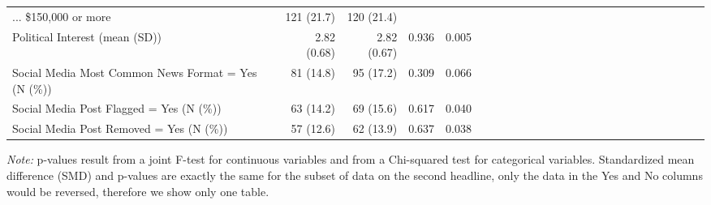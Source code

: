 \begin{table}[!htbp]
{\begin{threeparttable}
\begin{tabular}[t]{l|r|r|r|rl|r|r|r|rl|r|r|r|rl|r|r|r|rl|r|r|r|r}
... \$150,000 or more & 121 (21.7) & 120 (21.4) &  & \\
Political Interest (mean (SD)) & 2.82 (0.68) & 2.82 (0.67) & 0.936 & 0.005\\
Social Media Most Common News Format = Yes (N (\%)) & 81 (14.8) & 95 (17.2) & 0.309 & 0.066\\
Social Media Post Flagged = Yes (N (\%)) & 63 (14.2) & 69 (15.6) & 0.617 & 0.040\\
Social Media Post Removed = Yes (N (\%)) & 57 (12.6) & 62 (13.9) & 0.637 & 0.038\\
\bottomrule
\end{tabular}
\begin{tablenotes}
\item \small{\textit{Note:} p-values result from a joint F-test for continuous variables and from a Chi-squared test for categorical variables. Standardized mean difference (SMD) and p-values are exactly the same for the subset of data on the second headline, only the data in the Yes and No columns would be reversed, therefore we show only one table.}
\end{tablenotes}
\end{threeparttable}}
\end{table}